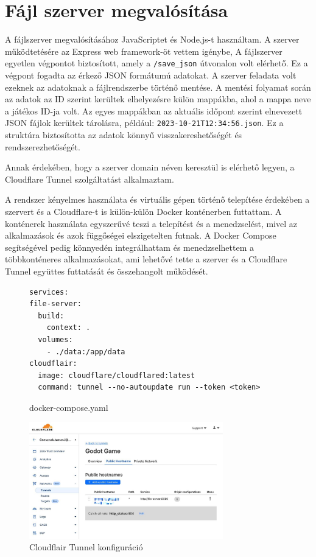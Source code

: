 \section{Fájl szerver megvalósítása}
A fájlszerver megvalósításához JavaScriptet és Node.js-t használtam.
A szerver működtetésére az Express web framework-öt \cite{ExpressN40:online} vettem igénybe, 
A fájlszerver egyetlen végpontot biztosított, amely a \lstinline{/save_json} útvonalon volt elérhető. 
Ez a végpont fogadta az érkező JSON formátumú adatokat. A szerver feladata volt ezeknek az adatoknak a fájlrendszerbe történő mentése. 
A mentési folyamat során az adatok az ID szerint kerültek elhelyezésre külön mappákba, ahol a mappa neve a játékos ID-ja volt. 
Az egyes mappákban az aktuális időpont szerint elnevezett JSON fájlok kerültek tárolásra, például: \texttt{2023-10-21T12:34:56.json}. 
Ez a struktúra biztosította az adatok könnyű visszakereshetőségét és rendszerezhetőségét.

Annak érdekében, hogy a szerver domain néven keresztül is elérhető legyen, a Cloudflare Tunnel \cite{TunnelZe60:online} szolgáltatást alkalmaztam. 

A rendszer kényelmes használata és virtuális gépen történő telepítése érdekében a szervert és a Cloudflare-t is \cite{WhyCloud84:online} külön-külön Docker \cite{DockerAc99:online} konténerben futtattam.
A konténerek használata egyszerűvé teszi a telepítést és a menedzselést, mivel az alkalmazások és azok függőségei elszigetelten futnak. 
A Docker Compose \cite{DockerCo66:online} segítségével pedig könnyedén integrálhattam és menedzselhettem a többkonténeres alkalmazásokat, ami lehetővé tette a szerver és a Cloudflare Tunnel együttes futtatását és összehangolt működését.

\begin{figure}[h]
    \centering
\begin{lstlisting}
services:
file-server:
  build:
    context: .
  volumes:
    - ./data:/app/data
cloudflair:
  image: cloudflare/cloudflared:latest 
  command: tunnel --no-autoupdate run --token <token>
\end{lstlisting}
\caption*{docker-compose.yaml}
\label{code:docker-compose}
\end{figure}
\begin{figure}[h]
    \centering
    \includegraphics[width=0.75\textwidth]{img/cloudflair-censored.jpg}
    \caption{Cloudflair Tunnel konfiguráció}
    \label{img:cloudflair-config}  
\end{figure}


